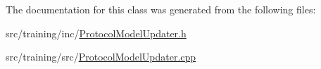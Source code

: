 The documentation for this class was generated from the following files\-:\begin{DoxyCompactItemize}
\item 
src/training/inc/\hyperlink{_protocol_model_updater_8h}{Protocol\-Model\-Updater.\-h}\item 
src/training/src/\hyperlink{_protocol_model_updater_8cpp}{Protocol\-Model\-Updater.\-cpp}\end{DoxyCompactItemize}
